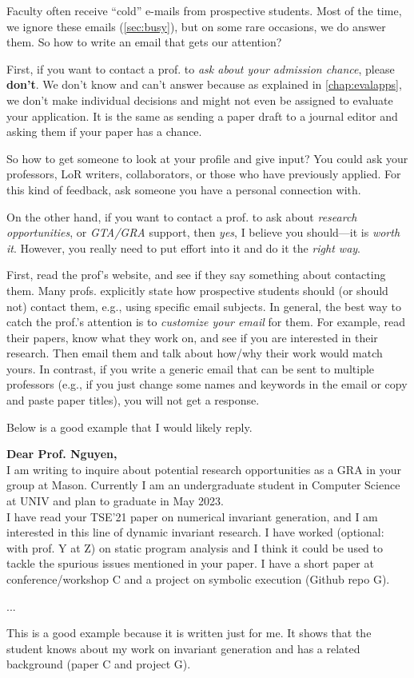 \documentclass[oneside,11pt,dvipsnames]{book}
\newenvironment{commentbox}[1][]{
  \small
  \begin{mybox}
    {\small \textbf{#1}}
  }{
  \end{mybox}
}
\begin{document}
Faculty often receive ``cold'' e-mails from prospective students. Most of the time, we ignore these emails (\autoref{sec:busy}), but on some rare occasions, we do answer them. So how to write an email that gets our attention?

First, if you want to contact a prof. to \emph{ask about your admission chance}, please \textbf{don't}. We don't know and can't answer because as explained in \autoref{chap:evalapps}, we don't make individual decisions and might not even be assigned to evaluate your application.  It is the same as sending a paper draft to a journal editor and asking them if your paper has a chance.

So how to get someone to look at your profile and give input? You could ask your professors, LoR writers, collaborators, or those who have previously applied. For this kind of feedback, ask someone you have a personal connection with.

On the other hand, if you want to contact a prof. to ask about \emph{research opportunities}, or \emph{GTA/GRA} support, then \emph{yes}, I believe you should---it is \emph{worth it}. However, you really need to put effort into it and do it the \emph{right way}.

First, read the prof's website, and see if they say something about contacting them. Many profs. explicitly state how prospective students should (or should not) contact them, e.g., using specific email subjects.
In general, the best way to catch the prof.'s attention is to \emph{customize your email} for them.  For example, read their papers, know what they work on, and see if you are interested in their research. Then email them and talk about how/why their work would match yours.
In contrast, if you write a generic email that can be sent to multiple professors (e.g., if you just change some names and keywords in the email or copy and paste paper titles), you will not get a response.

Below is a good example that I would likely reply.

\begin{commentbox}[Dear Prof. Nguyen,]\\

  I am writing to inquire about potential research opportunities as a GRA in your group at Mason. Currently I am an undergraduate student in Computer Science at UNIV and plan to graduate in May 2023.
    \\

  I have read your TSE'21 paper on numerical invariant generation, and I am interested in this line of dynamic invariant research. I have worked (optional: with prof. Y at Z) on static program analysis and I think it could be used to tackle the spurious issues mentioned in your paper. I have a short paper at conference/workshop C and a project on symbolic execution (Github repo G).

  ...

 \tcblower
  This is a good example because it is written just for me.  It shows that the student knows about my work on invariant generation and has a related background (paper C and project G).
\end{commentbox}
\end{document}
